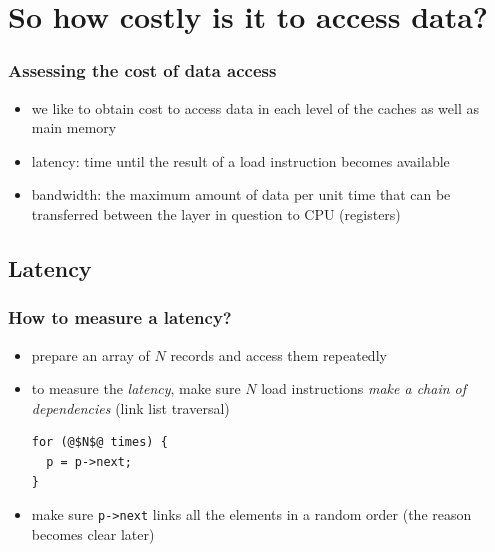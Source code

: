 \documentclass[12pt,dvipdfmx]{beamer}
\newcommand{\ao}[1]{{\color{blue}#1}}
\begin{document}
\section{So how costly is it to access data?}

\begin{frame}
  \frametitle{Assessing the cost of data access}
  \begin{itemize}
  \item we like to obtain cost to access data in each level
    of the caches as well as main memory

  \item \ao{latency:} time until the result of a
    load instruction becomes available

  \item \ao{bandwidth:} the maximum amount of data per unit time that
    can be transferred between the layer in question
    to CPU (registers)

  \end{itemize}
\end{frame}

\subsection{Latency}

\begin{frame}[fragile]
  \frametitle{How to measure a latency?}
  \begin{itemize}

  \item<1-> prepare an array of $N$ records and access
    them repeatedly

  \item<2-> to measure the {\em latency},
    make sure $N$ load instructions \ao{\em make a chain of dependencies} (link list traversal)

\begin{lstlisting}
for (@$N$@ times) {
  p = p->next;
}
\end{lstlisting}

\item<3-> make sure {\tt p->next} links all the
  elements in a random order (the reason becomes clear later)

\begin{center}
\def\svgwidth{0.6\textwidth}
{\scriptsize }
\end{center}
\end{itemize}
\end{frame}
\end{document}
